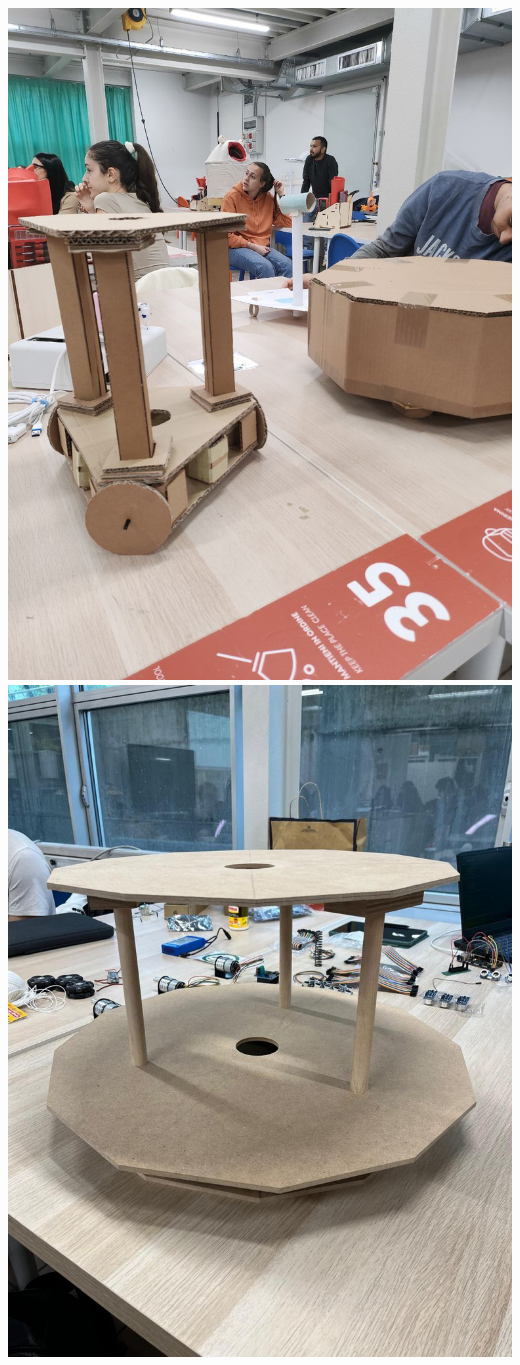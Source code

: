 \documentclass{article}
\begin{document}
\newpage
\noindent
\begin{minipage}[t]{0.5\textwidth}
  \vspace{0pt}
  \vspace{0pt}
  \includegraphics[width=0.9\linewidth]{photos/5.jpg}
  \vspace{0pt}
  \includegraphics[width=0.9\linewidth]{photos/9.jpg}

\end{minipage}
\end{document}
